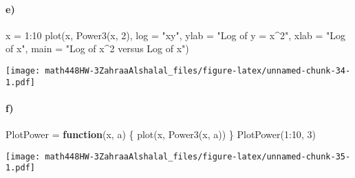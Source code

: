 \documentclass[
]{article}
\newenvironment{Shaded}{\begin{snugshade}}{\end{snugshade}}
\newcommand{\AttributeTok}[1]{\textcolor[rgb]{0.77,0.63,0.00}{#1}}
\newcommand{\ControlFlowTok}[1]{\textcolor[rgb]{0.13,0.29,0.53}{\textbf{#1}}}
\newcommand{\DecValTok}[1]{\textcolor[rgb]{0.00,0.00,0.81}{#1}}
\newcommand{\FunctionTok}[1]{\textcolor[rgb]{0.00,0.00,0.00}{#1}}
\newcommand{\NormalTok}[1]{#1}
\newcommand{\OtherTok}[1]{\textcolor[rgb]{0.56,0.35,0.01}{#1}}
\newcommand{\SpecialCharTok}[1]{\textcolor[rgb]{0.00,0.00,0.00}{#1}}
\newcommand{\StringTok}[1]{\textcolor[rgb]{0.31,0.60,0.02}{#1}}
\begin{document}
\hypertarget{e-1}{%
\paragraph{e)}\label{e-1}}

\begin{Shaded}
\begin{Highlighting}[]
\NormalTok{x }\OtherTok{=} \DecValTok{1}\SpecialCharTok{:}\DecValTok{10}
\FunctionTok{plot}\NormalTok{(x, }\FunctionTok{Power3}\NormalTok{(x, }\DecValTok{2}\NormalTok{), }\AttributeTok{log =} \StringTok{"xy"}\NormalTok{, }\AttributeTok{ylab =} \StringTok{"Log of y = x\^{}2"}\NormalTok{, }\AttributeTok{xlab =} \StringTok{"Log of x"}\NormalTok{, }
    \AttributeTok{main =} \StringTok{"Log of x\^{}2 versus Log of x"}\NormalTok{)}
\end{Highlighting}
\end{Shaded}

\texttt{[image: math448HW-3ZahraaAlshalal\_files/figure-latex/unnamed-chunk-34-1.pdf]}

\hypertarget{f-1}{%
\paragraph{f)}\label{f-1}}

\begin{Shaded}
\begin{Highlighting}[]
\NormalTok{PlotPower }\OtherTok{=} \ControlFlowTok{function}\NormalTok{(x, a) \{}
    \FunctionTok{plot}\NormalTok{(x, }\FunctionTok{Power3}\NormalTok{(x, a))}
\NormalTok{\}}
\FunctionTok{PlotPower}\NormalTok{(}\DecValTok{1}\SpecialCharTok{:}\DecValTok{10}\NormalTok{, }\DecValTok{3}\NormalTok{)}
\end{Highlighting}
\end{Shaded}

\texttt{[image: math448HW-3ZahraaAlshalal\_files/figure-latex/unnamed-chunk-35-1.pdf]}
\end{document}
